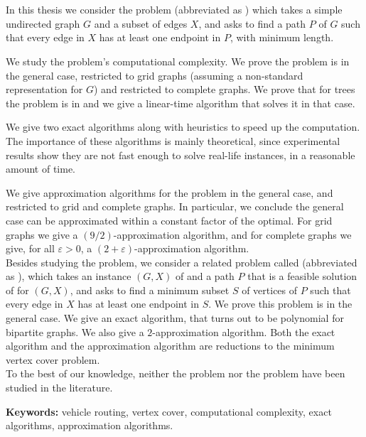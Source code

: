 \chapter*{\runtitle}

In this thesis we consider the  problem (abbreviated as ) which takes a simple undirected graph $G$ and a subset of edges $X$, and asks to find a path $P$ of $G$ such that every edge in $X$ has at least one endpoint in $P$, with minimum length.

We study the problem's computational complexity. We prove the problem is  in the general case, restricted to grid graphs (assuming a non-standard representation for $G$) and restricted to complete graphs. We prove that for trees the problem is in  and we give a linear-time algorithm that solves it in that case.

We give two exact algorithms along with heuristics to speed up the computation. The importance of these algorithms is mainly theoretical, since experimental results show they are not fast enough to solve real-life instances, in a reasonable amount of time.

We give approximation algorithms for the problem in the general case, and restricted to grid and complete graphs. In particular, we conclude the general case can be approximated within a constant factor of the optimal. For grid graphs we give a $(9/2)$-approximation algorithm, and for complete graphs we give, for all $\varepsilon > 0$, a $(2 + \varepsilon)$-approximation algorithm.\\

Besides studying the  problem, we consider a related problem called  (abbreviated as ), which takes an instance $(G, X)$ of  and a path $P$ that is a feasible solution of  for $(G, X)$, and asks to find a minimum subset $S$ of vertices of $P$ such that every edge in $X$ has at least one endpoint in $S$. We prove this problem is  in the general case. We give an exact algorithm, that turns out to be polynomial for bipartite graphs. We also give a $2$-approximation algorithm. Both the exact algorithm and the approximation algorithm are reductions to the minimum vertex cover problem.\\

To the best of our knowledge, neither the  problem nor the  problem have been studied in the literature.

\bigskip

\noindent\textbf{Keywords:} vehicle routing, vertex cover, computational complexity, exact algorithms, approximation algorithms.
